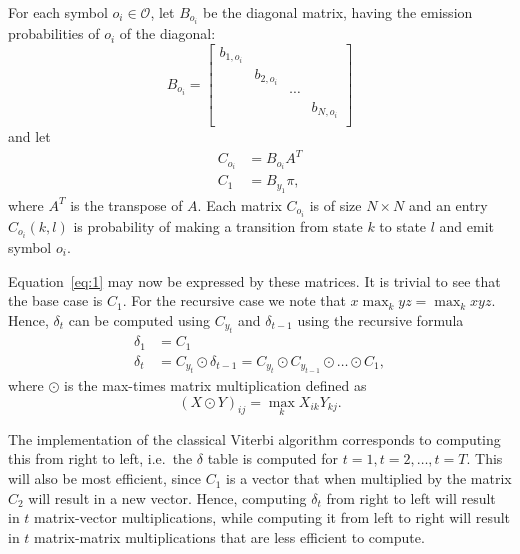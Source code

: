 For each symbol $o_i \in \mathcal{O}$, let $B_{o_i}$ be the diagonal matrix,
having the emission probabilities of $o_i$ of the diagonal:
\begin{equation*}
  B_{o_i} =
  \begin{bmatrix}
    b_{1, o_i} &            &        &            \\
               & b_{2, o_i} &        &            \\
               &            & \cdots &            \\
               &            &        & b_{N, o_i} \\
  \end{bmatrix}
\end{equation*}
and let
\begin{align*}
  C_{o_i}      & = B_{o_i} A^T                    \\
  C_1          & = B_{y_1} \pi,
\end{align*}
where $A^T$ is the transpose of $A$. Each matrix $C_{o_i}$ is of size $N \times
N$ and an entry $C_{o_i}(k, l)$ is probability of making a transition
from state $k$ to state $l$ and emit symbol $o_i$.

Equation~\eqref{eq:1} may now be expressed by these matrices. It is trivial to
see that the base case is $C_1$. For the recursive case we note that
$x \max_k y z = \max_k x y z$. Hence, $\delta_t$ can be computed using $C_{y_t}$
and $\delta_{t - 1}$ using the recursive formula
\begin{equation}
  \label{eq:2}
  \begin{aligned}
    \delta_1 &= C_1 \\
    \delta_t &= C_{y_t} \odot \delta_{t - 1} = C_{y_t} \odot C_{y_{t-1}} \odot \dots \odot C_1,
  \end{aligned}
\end{equation}
where $\odot$ is the max-times matrix multiplication defined as
\begin{equation*}
{(X \odot Y)}_{ij} = \max_k X_{ik} Y_{kj}.
\end{equation*}

The implementation of the classical Viterbi algorithm corresponds to
computing this from right to left, i.e.\ the $\delta$ table is computed for $t
= 1, t=2, \dots, t=T$. This will also be most efficient, since
$C_1$ is a vector that when multiplied by the matrix $C_2$ will result in a new
vector. Hence, computing $\delta_t$ from right to left will result in $t$
matrix-vector multiplications, while computing it from left to right will
result in $t$ matrix-matrix multiplications that are less efficient to compute.

